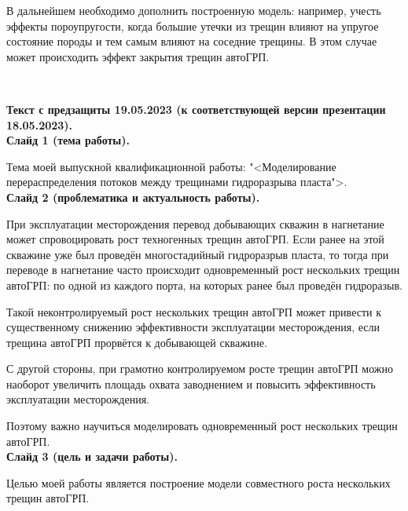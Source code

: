 \documentclass[a4paper, 12pt]{article}
\begin{document}
В дальнейшем необходимо дополнить построенную модель: например, учесть эффекты пороупругости, когда большие утечки из трещин влияют на упругое состояние породы и тем самым влияют на соседние трещины.
В этом случае может происходить эффект закрытия трещин автоГРП.












\newpage
\ 
\newpage

















\textbf{\large Текст с предзащиты 19.05.2023 (к соответствующей версии презентации 18.05.2023).}\\

\textbf{Слайд 1 (тема работы).}

Тема моей выпускной квалификационной работы: "<Моделирование перераспределения потоков между трещинами гидроразрыва пласта">.\\

\textbf{Слайд 2 (проблематика и актуальность работы).}

При эксплуатации месторождения перевод добывающих скважин в нагнетание может спровоцировать рост техногенных трещин автоГРП.
Если ранее на этой скважине уже был проведён многостадийный гидроразрыв пласта, то тогда при переводе в нагнетание часто происходит одновременный рост нескольких трещин автоГРП: по одной из каждого порта, на которых ранее был проведён гидроразыв.

Такой неконтролируемый рост нескольких трещин автоГРП может привести к существенному снижению эффективности эксплуатации месторождения, если трещина автоГРП прорвётся к добывающей скважине.

С другой стороны, при грамотно контролируемом росте трещин автоГРП можно наоборот увеличить площадь охвата заводнением и повысить эффективность эксплуатации месторождения.

Поэтому важно научиться моделировать одновременный рост нескольких трещин автоГРП.\\ 

\textbf{Слайд 3 (цель и задачи работы).}

Целью моей работы является построение модели совместного роста нескольких трещин автоГРП.
\end{document}
